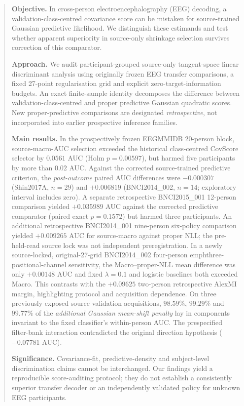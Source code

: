 \begin{abstract}
\textbf{Objective.}
In cross-person electroencephalography (EEG) decoding,
a validation-class-centred covariance score can be
mistaken for source-trained Gaussian predictive
likelihood. We distinguish these estimands and test
whether apparent superiority in source-only shrinkage
selection survives correction of this comparator.

\textbf{Approach.}
We audit participant-grouped source-only tangent-space
linear discriminant analysis using originally frozen
EEG transfer comparisons, a fixed 27-point
regularisation grid and explicit zero-target-information
budgets. An exact finite-sample identity decomposes
the difference between validation-class-centred and
proper predictive Gaussian quadratic scores. New
proper-predictive comparisons are designated
\emph{retrospective}, not incorporated into earlier
prospective inference families.

\textbf{Main results.}
In the prospectively frozen EEGMMIDB 20-person block,
source-macro-AUC selection exceeded the historical
class-centred CovScore selector by $0.0561$ AUC
(Holm $p=0.00597$), but harmed five participants by
more than $0.02$ AUC. Against the corrected
source-trained predictive criterion, the
\emph{post-outcome} paired AUC differences were
$-0.000307$ (Shin2017A, $n=29$) and
$+0.006819$ (BNCI2014\_002, $n=14$;
exploratory interval includes zero).
A separate retrospective BNCI2015\_001 12-person
comparison yielded $+0.035989$ AUC against the
corrected predictive comparator (paired exact
$p=0.1572$) but harmed three participants.
An additional retrospective BNCI2014\_001
nine-person six-policy comparison yielded
$+0.009265$ AUC for source-macro against
proper NLL; the pre-held-read source lock
was not independent preregistration. In a newly
source-locked, original-27-grid BNCI2014\_002
four-person emph{three-positional-channel}
sensitivity, the Macro--proper-NLL mean difference
was only $+0.00148$ AUC and fixed $\lambda=0.1$
and logistic baselines both exceeded Macro.
This contrasts with the $+0.09625$ two-person
retrospective AlexMI margin, highlighting
protocol and acquisition dependence. On three
previously exposed source-validation acquisitions,
$98.59\%$, $99.29\%$ and $99.77\%$ of the
\emph{additional Gaussian mean-shift penalty} lay
in components invariant to the fixed classifier's
within-person AUC. The prespecified filter-bank
interaction contradicted the original direction
hypothesis ($-0.07781$ AUC).

\textbf{Significance.}
Covariance-fit, predictive-density and subject-level
discrimination claims cannot be interchanged.
Our findings yield a reproducible score-auditing
protocol; they do not establish a consistently
superior transfer decoder or an independently
validated policy for unknown EEG participants.
\end{abstract}
